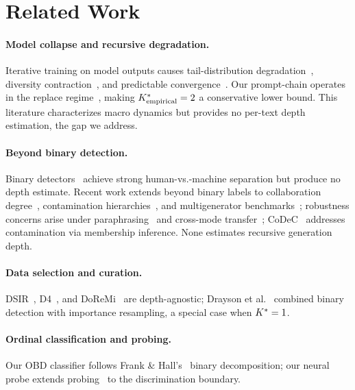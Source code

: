 \section{Related Work}
\label{sec:related_work}

\paragraph{Model collapse and recursive degradation.}
Iterative training on model outputs causes tail-distribution degradation~\cite{shumailov2024collapse, alemohammad2024selfconsuming, dohmatob2024model, dohmatob2025strong, fu2025theoretical}, diversity contraction~\cite{guo2024curious, padmakumar2024writing, briesch2023selfconsuming}, and predictable convergence~\cite{schaeffer2025position, kazdan2025collapse, gerstgrasser2024model, wang2025unveiling}.
Our prompt-chain operates in the replace regime~\cite{kazdan2025collapse}, making ${K^*_{\text{empirical}}} = 2$ a conservative lower bound.
This literature characterizes macro dynamics but provides no per-text depth estimation, the gap we address.

\paragraph{Beyond binary detection.}
Binary detectors~\cite{mitchell2023detectgpt, bao2024fast, hans2024binoculars, basani2026diveye, zhang2024minkpp} achieve strong human-vs.-machine separation but produce no depth estimate.
Recent work extends beyond binary labels to collaboration degree~\cite{cheng2025beyond}, contamination hierarchies~\cite{mehta2025beyond}, and multigenerator benchmarks~\cite{wang2024semeval}; robustness concerns arise under paraphrasing~\cite{sadasivan2023detect, krishna2023paraphrasing} and cross-mode transfer~\cite{hao2025rewrite}; CoDeC~\cite{zawalski2026codec} addresses contamination via membership inference.
None estimates recursive generation depth.

\paragraph{Data selection and curation.}
DSIR~\cite{xie2023dsir}, D4~\cite{tirumala2023d4}, and DoReMi~\cite{xie2023doremi} are depth-agnostic; Drayson et al.~\cite{drayson2025} combined binary detection with importance resampling, a special case when ${K^*} = 1$.

\paragraph{Ordinal classification and probing.}
Our OBD classifier follows Frank \& Hall's~\cite{frank2001ordinal} binary decomposition; our neural probe extends probing~\cite{alain2017understanding, belinkov2022probing} to the discrimination boundary.
